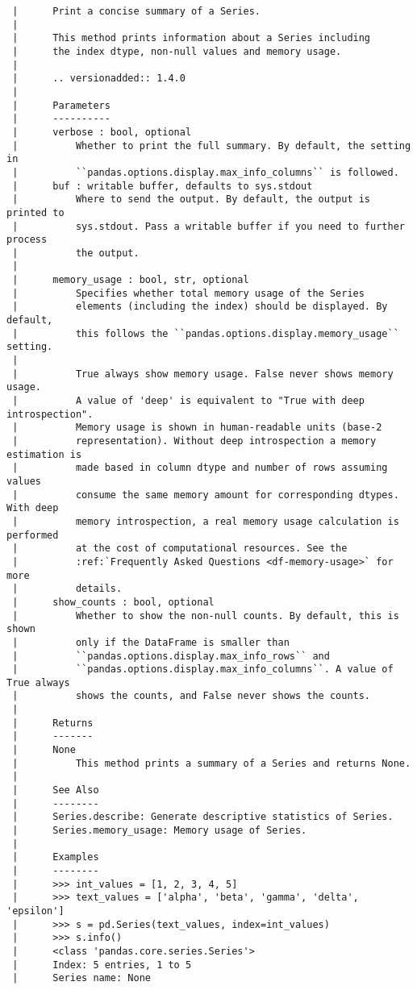 \documentclass[
  letterpaper,
  DIV=11,
  numbers=noendperiod]{scrreprt}
\begin{document}
\begin{verbatim}
 |      Print a concise summary of a Series.
 |      
 |      This method prints information about a Series including
 |      the index dtype, non-null values and memory usage.
 |      
 |      .. versionadded:: 1.4.0
 |      
 |      Parameters
 |      ----------
 |      verbose : bool, optional
 |          Whether to print the full summary. By default, the setting in
 |          ``pandas.options.display.max_info_columns`` is followed.
 |      buf : writable buffer, defaults to sys.stdout
 |          Where to send the output. By default, the output is printed to
 |          sys.stdout. Pass a writable buffer if you need to further process
 |          the output.
 |      
 |      memory_usage : bool, str, optional
 |          Specifies whether total memory usage of the Series
 |          elements (including the index) should be displayed. By default,
 |          this follows the ``pandas.options.display.memory_usage`` setting.
 |      
 |          True always show memory usage. False never shows memory usage.
 |          A value of 'deep' is equivalent to "True with deep introspection".
 |          Memory usage is shown in human-readable units (base-2
 |          representation). Without deep introspection a memory estimation is
 |          made based in column dtype and number of rows assuming values
 |          consume the same memory amount for corresponding dtypes. With deep
 |          memory introspection, a real memory usage calculation is performed
 |          at the cost of computational resources. See the
 |          :ref:`Frequently Asked Questions <df-memory-usage>` for more
 |          details.
 |      show_counts : bool, optional
 |          Whether to show the non-null counts. By default, this is shown
 |          only if the DataFrame is smaller than
 |          ``pandas.options.display.max_info_rows`` and
 |          ``pandas.options.display.max_info_columns``. A value of True always
 |          shows the counts, and False never shows the counts.
 |      
 |      Returns
 |      -------
 |      None
 |          This method prints a summary of a Series and returns None.
 |      
 |      See Also
 |      --------
 |      Series.describe: Generate descriptive statistics of Series.
 |      Series.memory_usage: Memory usage of Series.
 |      
 |      Examples
 |      --------
 |      >>> int_values = [1, 2, 3, 4, 5]
 |      >>> text_values = ['alpha', 'beta', 'gamma', 'delta', 'epsilon']
 |      >>> s = pd.Series(text_values, index=int_values)
 |      >>> s.info()
 |      <class 'pandas.core.series.Series'>
 |      Index: 5 entries, 1 to 5
 |      Series name: None

\end{verbatim}
\end{document}

